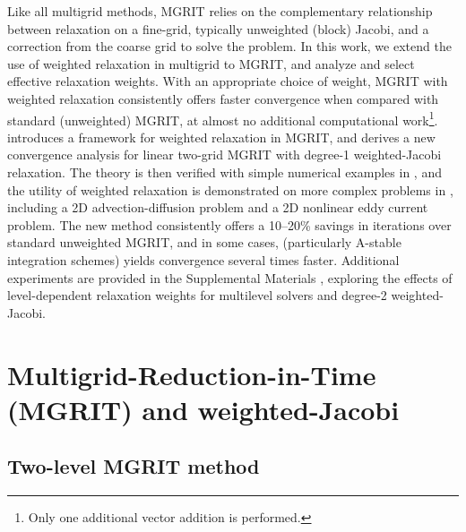 \documentclass[VANCOUVER,STIX1COL]{WileyNJD-v2}
\begin{document}
Like all multigrid methods, MGRIT relies on the complementary relationship between relaxation on a 
fine-grid, typically unweighted (block) Jacobi, and a correction from the coarse grid to solve the problem. 
In this work, we extend the use of weighted relaxation in multigrid \cite{AdBrHuTu2003,BaFaKoYa2011,TrOo2001,BrHeMc2000} to MGRIT, and analyze and select effective relaxation weights. With an appropriate choice of weight, MGRIT with weighted relaxation consistently offers faster convergence when compared with standard (unweighted) MGRIT, at almost no additional computational work\footnote{Only one additional vector addition is performed.}.  introduces a framework for weighted relaxation in MGRIT, and derives a new convergence analysis for linear two-grid MGRIT with degree-1 weighted-Jacobi relaxation. The theory is then verified with simple numerical examples in , and the utility of weighted relaxation is demonstrated on more complex problems in , including a 2D advection-diffusion problem and a 2D nonlinear eddy current problem. The new method consistently offers a 10--20\% savings in iterations over standard unweighted MGRIT, and in some cases, (particularly A-stable integration schemes) yields convergence several times faster. Additional experiments are provided in the Supplemental Materials , exploring the effects of
level-dependent relaxation weights for multilevel solvers and degree-2 weighted-Jacobi.



\section{Multigrid-Reduction-in-Time (MGRIT) and weighted-Jacobi}
\label{sec:methods}
\subsection{Two-level MGRIT method}
\end{document}
